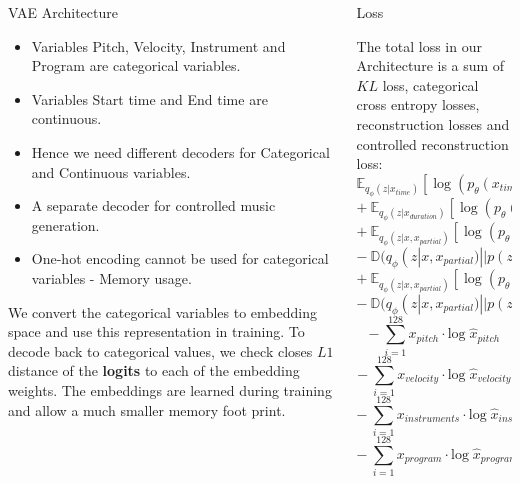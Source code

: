\documentclass[final]{beamer}
\newlength{\onecolwid}
\newlength{\twocolwid}
\begin{document}
\begin{frame}[t]
\begin{columns}[t]
\begin{column}{\twocolwid}
\begin{columns}[t,totalwidth=\twocolwid]
\begin{column}{\onecolwid}
\begin{block}{VAE Architecture}
\begin{itemize}
\item Variables Pitch, Velocity, Instrument and Program are categorical variables.
\item Variables Start time and End time are continuous.
\item Hence we need different decoders for Categorical and Continuous variables.
\item A separate decoder for controlled music generation.
\item One-hot encoding cannot be used for categorical variables - Memory usage.
\end{itemize}

We convert the categorical variables to embedding space and use this representation in training. To decode back to categorical values, we check closes $L1$ distance of the \textbf{logits} to each of the embedding weights. The embeddings are learned during training and allow a much smaller memory foot print.
 


\end{block}

\end{column} %

\begin{column}{\onecolwid}\vspace{-.6in} %


\begin{block}{Loss}


The total loss in our Architecture is a sum of $KL$ loss, categorical cross entropy losses, reconstruction losses and controlled reconstruction loss:
$$ \mathbb{E}_{q_{\phi}(z|x_{time})} [ \log(p_{\theta}(x_{time}|z))]  - \mathbb{D}(q_{\phi}(z|x) || p(z)) $$
$$ +~\mathbb{E}_{q_{\phi}(z|x_{duration})} [ \log(p_{\theta}(x_{time}|z))] $$
$$ +~\mathbb{E}_{q_{\phi}(z|x,x_{partial})} [ \log(p_{\theta}(x|z, x_{partial}))] $$
$$ -~\mathbb{D}(q_{\phi}(z|x, x_{partial}) || p(z)) $$
$$ +~ \mathbb{E}_{q_{\phi}(z|x,x_{partial})} [ \log(p_{\theta}(x|z, x_{partial}))] $$
$$ -~ \mathbb{D}(q_{\phi}(z|x, x_{partial}) || p(z)) $$
$$ -~\sum_{i=1}^{128} x_{pitch} \cdot \mathrm{log}\; {\hat{x}}_{pitch} $$
$$ -~\sum_{i=1}^{128} x_{velocity} \cdot \mathrm{log}\; {\hat{x}}_{velocity} $$
$$ -~\sum_{i=1}^{128} x_{instruments} \cdot \mathrm{log}\; {\hat{x}}_{instruments} $$
$$ -~\sum_{i=1}^{128} x_{program} \cdot \mathrm{log}\; {\hat{x}}_{program} $$


\end{block}
\end{column}
\end{columns}
\end{column}
\end{columns}
\end{frame}
\end{document}
